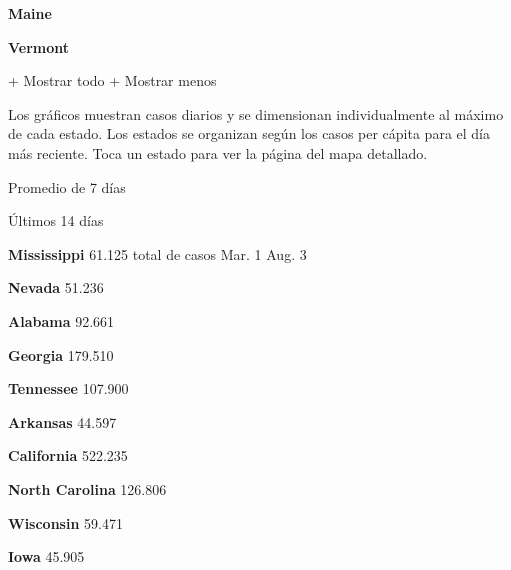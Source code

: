\textbf{Maine}

\href{https://www.nytimes.com/interactive/2020/us/vermont-coronavirus-cases.html}{}

\textbf{Vermont}

+ Mostrar todo + Mostrar menos

Los gráficos muestran casos diarios y se dimensionan individualmente al
máximo de cada estado. Los estados se organizan según los casos per
cápita para el día más reciente. Toca un estado para ver la página del
mapa detallado.

\href{https://www.nytimes.com/interactive/2020/us/mississippi-coronavirus-cases.html}{}

Promedio de 7 días

Últimos 14 días

\textbf{Mississippi} 61.125 total de casos Mar. 1 Aug. 3

\href{https://www.nytimes.com/interactive/2020/us/nevada-coronavirus-cases.html}{}

\textbf{Nevada} 51.236

\href{https://www.nytimes.com/interactive/2020/us/alabama-coronavirus-cases.html}{}

\textbf{Alabama} 92.661

\href{https://www.nytimes.com/interactive/2020/us/georgia-coronavirus-cases.html}{}

\textbf{Georgia} 179.510

\href{https://www.nytimes.com/interactive/2020/us/tennessee-coronavirus-cases.html}{}

\textbf{Tennessee} 107.900

\href{https://www.nytimes.com/interactive/2020/us/arkansas-coronavirus-cases.html}{}

\textbf{Arkansas} 44.597

\href{https://www.nytimes.com/interactive/2020/us/california-coronavirus-cases.html}{}

\textbf{California} 522.235

\href{https://www.nytimes.com/interactive/2020/us/north-carolina-coronavirus-cases.html}{}

\textbf{North Carolina} 126.806

\href{https://www.nytimes.com/interactive/2020/us/wisconsin-coronavirus-cases.html}{}

\textbf{Wisconsin} 59.471

\href{https://www.nytimes.com/interactive/2020/us/iowa-coronavirus-cases.html}{}

\textbf{Iowa} 45.905

